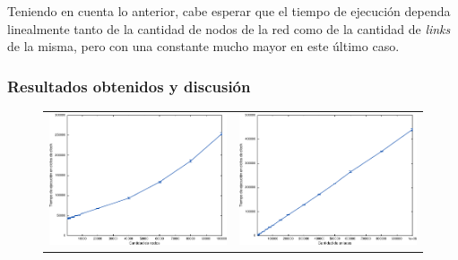             Teniendo en cuenta lo anterior, cabe esperar que el tiempo de ejecución dependa linealmente tanto de la cantidad de nodos de la red como de la cantidad de \emph{links} de la misma, pero con una constante mucho mayor en este último caso.

            \subsubsection*{Resultados obtenidos y discusión}

            \begin{figure}
                \begin{center}

                    \begin{tabular}{cc}
                        \includegraphics{graficos/exp1-a.pdf} & \includegraphics{graficos/exp1-b.pdf} \\
                    \end{tabular}

                    \label*{Resultados arrojados por el experimento 1. El gráfico de la izquierda representa el tiempo promedio de ejecución del algoritmo \emph{PageRank} en función de la cantidad de nodos de la red, y el de la derecha, en función de la cantidad de \emph{links} de la misma. Se representa también el desvío estándar de las mediciones.}
                \end{center}
            \end{figure}

